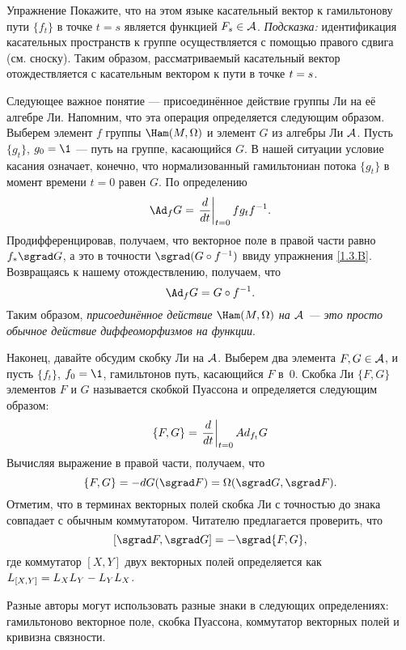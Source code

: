 \begin{thm}{Упражнение}\label{1.4.G}
Покажите, что на этом языке касательный вектор к гамильтонову пути $\{f_t\}$ в точке $t = s$ является функцией $F_s \in \mathcal{A}$.
\emph{Подсказка:} идентификация касательных пространств к группе осуществляется с помощью правого сдвига (см. сноску).
Таким образом, рассматриваемый касательный вектор отождествляется с
касательным вектором к пути  в точке $t \z= s$.
\end{thm}

Следующее важное понятие --- присоединённое действие группы Ли на её алгебре Ли.
Напомним, что эта операция определяется следующим образом.
Выберем элемент $f$ группы $\Ham (M, \Omega)$ и элемент $G$ из алгебры Ли $\mathcal{A}$.
Пусть $\{g_t\}$, $g_0 = \1$ --- путь на группе, касающийся $G$.
В нашей ситуации условие касания означает, конечно, что нормализованный гамильтониан потока $\{g_t\}$ в момент времени $t = 0$ равен $G$.
По определению 
\[\Ad_f G = \left.\frac{\d}{\d t}\right|_{t=0} fg_tf^{-1}.\]
Продифференцировав, получаем, что векторное поле в правой части равно $f_\ast \sgrad G$, а это в точности $\sgrad  (G\circ f^{-1})$ ввиду упражнения \ref{1.3.B}.
Возвращаясь к нашему отождествлению, получаем, что 
\[\Ad_f G = G \circ f^{-1}.\]
Таким образом, \emph{присоединённое действие $\Ham (M, \Omega)$ на $\mathcal{A}$ --- это просто обычное действие диффеоморфизмов на функции}.

Наконец, давайте обсудим скобку Ли на $\mathcal{A}$.
Выберем два элемента $F,G \in \mathcal{A}$, и пусть $\{f_t\}$, $f_0 = \1$, гамильтонов путь, касающийся $F$ в~$0$.
Скобка Ли $\{F, G\}$ элементов $F$ и $G$ называется скобкой Пуассона и определяется следующим образом: 
\[\{F, G\}=\left.\frac{d}{d t}\right|_{t=0}Ad_{f_t}G\]
Вычисляя выражение в правой части, получаем, что 
\[\{F, G\} = -\d G (\sgrad F) = \Omega (\sgrad G, \sgrad F).\]
Отметим, что в терминах векторных полей скобка Ли с точностью до знака совпадает с обычным коммутатором.
Читателю предлагается проверить, что 
\[[\sgrad F, \sgrad G] = -\sgrad  \{F, G\},\]
где коммутатор $[X, Y]$ двух векторных полей определяется как $L_{[X, Y]} \z= L_X L_Y -L_Y L_X$.

\begin{framed}
 Разные авторы могут использовать разные
знаки в следующих определениях:
гамильтоново векторное поле,
скобка Пуассона,
коммутатор векторных полей
и кривизна связности.
\end{framed}

